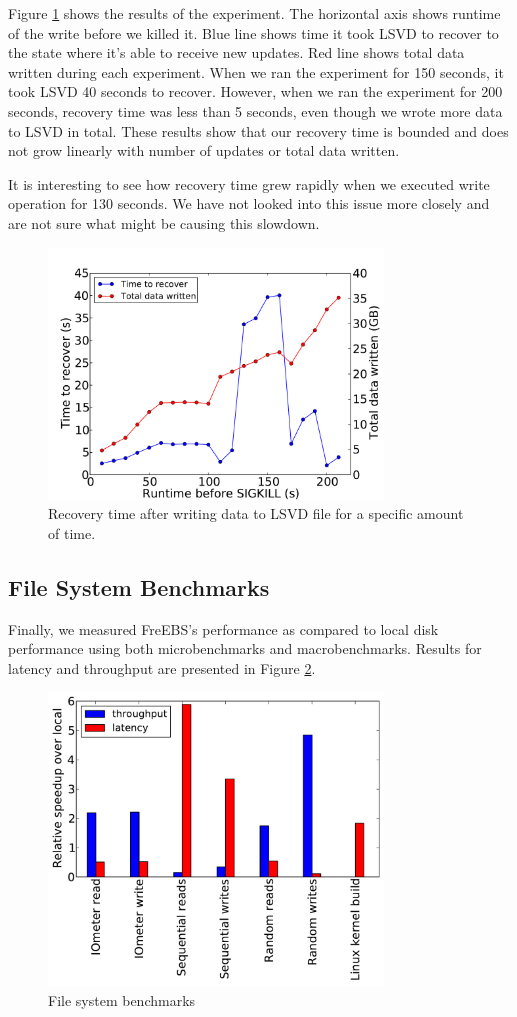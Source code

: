 Figure \ref{fig:checkpointing} shows the results of the experiment. The horizontal axis shows runtime of the write before we killed it. Blue line shows time it took LSVD to recover to the state where it's able to receive new updates. Red line shows total data written during each experiment. When we ran the experiment for 150 seconds, it took LSVD 40 seconds to recover. However, when we ran the experiment for 200 seconds, recovery time was less than 5 seconds, even though we wrote more data to LSVD in total. These results show that our recovery time is bounded and does not grow linearly with number of updates or total data written.

It is interesting to see how recovery time grew rapidly when we executed write operation for 130 seconds. We have not looked into this issue more closely and are not sure what might be causing this slowdown.

\begin{figure}[t!]
  \centering
   \includegraphics[width=3.5in]{figures/checkpointing.pdf}
   \caption{Recovery time after writing data to LSVD file for a specific amount of time.}
   \label{fig:checkpointing}
\end{figure}

\subsection{File System Benchmarks}
Finally, we measured FreEBS's performance as compared to local disk performance using both microbenchmarks and macrobenchmarks. Results for latency and throughput are presented in Figure \ref{fig:benchmarks}.

\begin{figure}[t!]
  \centering
   \includegraphics[width=3.5in]{figures/benchmarks.pdf}
   \caption{File system benchmarks}
   \label{fig:benchmarks}
\end{figure}

